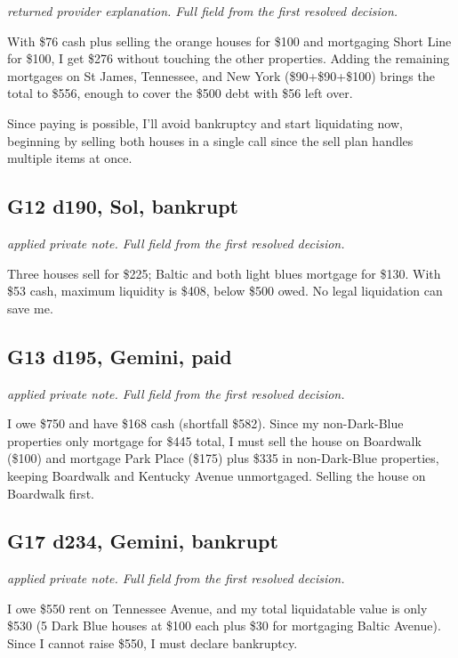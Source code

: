 {\small\textit{returned provider explanation. Full field from the first resolved decision.}\par With \$76 cash plus selling the orange houses for \$100 and mortgaging Short Line for \$100, I get \$276 without touching the other properties. Adding the remaining mortgages on St James, Tennessee, and New York (\$90+\$90+\$100) brings the total to \$556, enough to cover the \$500 debt with \$56 left over.\par Since paying is possible, I'll avoid bankruptcy and start liquidating now, beginning by selling both houses in a single call since the sell plan handles multiple items at once.\par \par}
\subsection*{G12 d190, Sol, bankrupt}
{\small\textit{applied private note. Full field from the first resolved decision.}\par Three houses sell for \$225; Baltic and both light blues mortgage for \$130. With \$53 cash, maximum liquidity is \$408, below \$500 owed. No legal liquidation can save me.\par}
\subsection*{G13 d195, Gemini, paid}
{\small\textit{applied private note. Full field from the first resolved decision.}\par I owe \$750 and have \$168 cash (shortfall \$582). Since my non-Dark-Blue properties only mortgage for \$445 total, I must sell the house on Boardwalk (\$100) and mortgage Park Place (\$175) plus \$335 in non-Dark-Blue properties, keeping Boardwalk and Kentucky Avenue unmortgaged. Selling the house on Boardwalk first.\par}
\subsection*{G17 d234, Gemini, bankrupt}
{\small\textit{applied private note. Full field from the first resolved decision.}\par I owe \$550 rent on Tennessee Avenue, and my total liquidatable value is only \$530 (5 Dark Blue houses at \$100 each plus \$30 for mortgaging Baltic Avenue). Since I cannot raise \$550, I must declare bankruptcy.\par}
